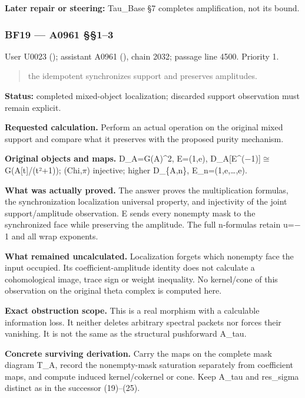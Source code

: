 \documentclass[10pt,a4paper,oneside]{report}
\begin{document}
\textbf{Later repair or steering:} Tau\_Base §7 completes amplification,
not its bound.

\subsubsection{BF19 --- A0961 §§1--3}\label{bf19-a0961-13}

User U0023 (\protect{});
assistant A0961 (\protect{}),
chain 2032; passage line 4500. Priority 1.

\begin{quote}
the idempotent synchronizes support and preserves amplitudes.
\end{quote}

\textbf{Status:} completed mixed-object localization; discarded support
observation must remain explicit.

\textbf{Requested calculation.} Perform an actual operation on the
original mixed support and compare what it preserves with the proposed
purity mechanism.

\textbf{Original objects and maps.} D\_A=G(A)\^{}2, E=(1,e),
D\_A[E\textasciicircum{}(\allowbreak{}\ensuremath{−}\allowbreak{}1)]\allowbreak{}\ensuremath{≅}\allowbreak{}G(A[t]/(t²+1));
(Chi,\allowbreak{}\ensuremath{π}\allowbreak{}) injective; higher
D\_\{A,n\}, E\_n=(1,e,\ldots,e).

\textbf{What was actually proved.} The answer proves the multiplication
formulas, the synchronization localization universal property, and
injectivity of the joint support/amplitude observation. E sends every
nonempty mask to the synchronized face while preserving the amplitude.
The full n-formulas retain u=\allowbreak{}\ensuremath{−}\allowbreak{}1
and all wrap exponents.

\textbf{What remained uncalculated.} Localization forgets which nonempty
face the input occupied. Its coefficient-amplitude identity does not
calculate a cohomological image, trace sign or weight inequality. No
kernel/cone of this observation on the original theta complex is
computed here.

\textbf{Exact obstruction scope.} This is a real morphism with a
calculable information loss. It neither deletes arbitrary spectral
packets nor forces their vanishing. It is not the same as the structural
pushforward A\_tau.

\textbf{Concrete surviving derivation.} Carry the maps on the complete
mask diagram T\_A, record the nonempty-mask saturation separately from
coefficient maps, and compute induced kernel/cokernel or cone. Keep
A\_tau and res\_sigma distinct as in the successor (19)--(25).
\end{document}
